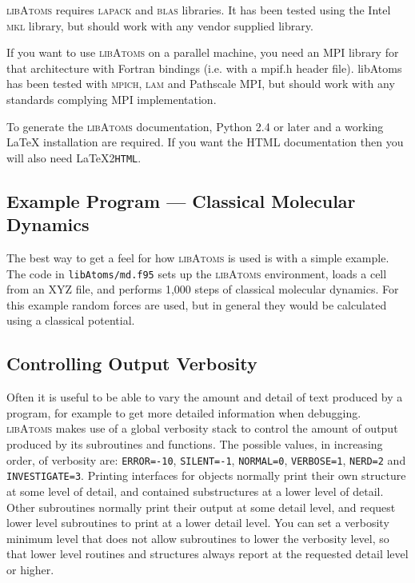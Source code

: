 \textsc{libAtoms} requires \textsc{lapack} and \textsc{blas}
libraries. It has been tested using the Intel \textsc{mkl} library,
but should work with any vendor supplied library.

If you want to use \textsc{libAtoms} on a parallel machine, you need
an MPI library for that architecture with Fortran bindings (i.e. with
a mpif.h header file). libAtoms has been tested with \textsc{mpich},
\textsc{lam} and Pathscale MPI, but should work with any standards complying
MPI implementation.

To generate the \textsc{libAtoms} documentation, Python 2.4 or later
 and a working \LaTeX{} installation are required. If you want the HTML
documentation then you will also need \LaTeX 2\texttt{HTML}.

\newpage

\subsection*{Example Program --- Classical Molecular Dynamics}

The best way to get a feel for how \textsc{libAtoms} is used
is with a simple example. The code in \texttt{libAtoms/md.f95} sets up
the \textsc{libAtoms} environment, loads a cell from
an XYZ file, and performs 1,000 steps of classical molecular
dynamics. For this example random forces are used, but in general
they would be calculated using a classical potential.

\subsection*{Controlling Output Verbosity}

Often it is useful to be able to vary the amount and detail of text
produced by a program, for example to get more detailed information
when debugging. \textsc{libAtoms} makes use of a global verbosity
stack to control the amount of output produced by its subroutines and
functions. The possible values, in increasing order, of verbosity are:
\texttt{ERROR=-10}, \texttt{SILENT=-1}, \texttt{NORMAL=0},
\texttt{VERBOSE=1}, \texttt{NERD=2} and \texttt{INVESTIGATE=3}.  Printing
interfaces for objects normally print their own structure at some 
level of detail, and contained substructures at a lower level of detail.  
Other subroutines normally print their output at some detail level, and
request lower level subroutines to print at a lower detail level.
You can set a verbosity minimum level that does not allow subroutines
to lower the verbosity level, so that lower level routines and structures
always report at the requested detail level or higher.

